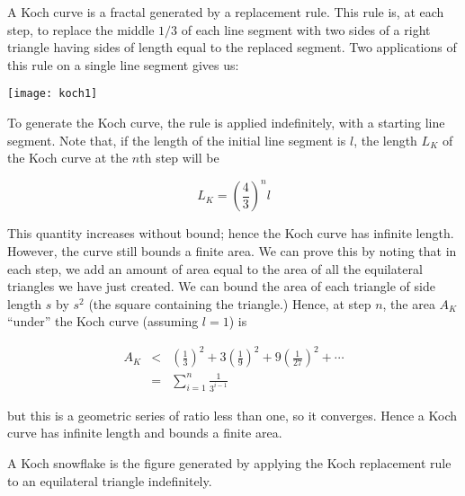 \documentclass{article}
\begin{document}
A Koch curve is a fractal generated by a replacement rule.  This rule is, at each step, to replace the middle $1/3$ of each line segment with two sides of a right triangle having sides of length equal to the replaced segment.  Two applications of this rule on a single line segment gives us:

\begin{center}
\texttt{[image: koch1]}
\end{center}

To generate the Koch curve, the rule is applied indefinitely, with a starting line segment.  Note that, if the length of the initial line segment is $l$, the length $L_K$ of the Koch curve at the $n$th step will be

$$ L_K = \left( \frac{4}{3} \right)^n l $$

This quantity increases without bound; hence the Koch curve has infinite length.  However, the curve still bounds a finite area.  We can prove this by noting that in each step, we add an amount of area equal to the area of all the equilateral triangles we have just created.  We can bound the area of each triangle of side length $s$ by $s^2$ (the square containing the triangle.)  Hence, at step $n$, the area $A_K$ ``under'' the Koch curve (assuming $l=1$) is 

\begin{eqnarray*} A_K & < & \left(\frac{1}{3}\right)^2 + 3 \left(\frac{1}{9}\right)^2 + 9 \left(\frac{1}{27}\right)^2 +  \cdots \\ 
 & = & \sum_{i=1}^n \frac{1}{3^{i-1}} 
\end{eqnarray*}

but this is a geometric series of ratio less than one, so it converges.  Hence a Koch curve has infinite length and bounds a finite area.

A Koch snowflake is the figure generated by applying the Koch replacement rule to an equilateral triangle indefinitely.
\end{document}
